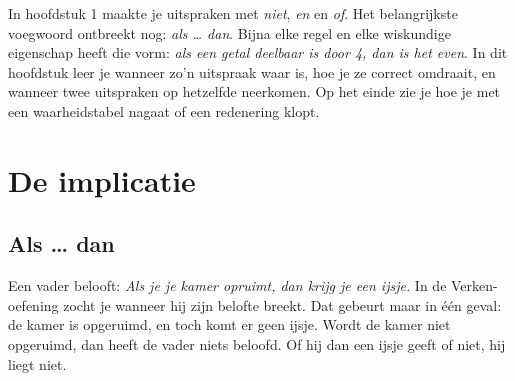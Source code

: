 In hoofdstuk 1 maakte je uitspraken met \textit{niet}, \textit{en} en \textit{of}. Het belangrijkste voegwoord ontbreekt nog: \textit{als \ldots{} dan}. Bijna elke regel en elke wiskundige eigenschap heeft die vorm: \textit{als een getal deelbaar is door 4, dan is het even}. In dit hoofdstuk leer je wanneer zo'n uitspraak waar is, hoe je ze correct omdraait, en wanneer twee uitspraken op hetzelfde neerkomen. Op het einde zie je hoe je met een waarheidstabel nagaat of een redenering klopt.

\begin{oefeningen}[Start]

\end{oefeningen}


\section{De implicatie}

\subsection{Als \ldots{} dan}

Een vader belooft: \textit{Als je je kamer opruimt, dan krijg je een ijsje.} In de Verken-oefening zocht je wanneer hij zijn belofte breekt. Dat gebeurt maar in één geval: de kamer is opgeruimd, en toch komt er geen ijsje. Wordt de kamer niet opgeruimd, dan heeft de vader niets beloofd. Of hij dan een ijsje geeft of niet, hij liegt niet.

\begin{theorie}
\end{theorie}

